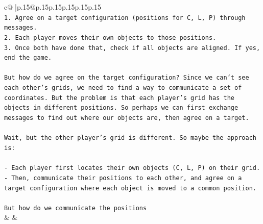 \documentclass{article}
\begin{document}
{\begin{supertabular}{c@{$\;$}|p{.15\linewidth}@{}p{.15\linewidth}p{.15\linewidth}p{.15\linewidth}p{.15\linewidth}p{.15\linewidth}}
{{{\\ 
\texttt{1. Agree on a target configuration (positions for C, L, P) through messages.} \\
\texttt{2. Each player moves their own objects to those positions.} \\
\texttt{3. Once both have done that, check if all objects are aligned. If yes, end the game.} \\
\\ 
\texttt{But how do we agree on the target configuration? Since we can't see each other's grids, we need to find a way to communicate a set of coordinates. But the problem is that each player's grid has the objects in different positions. So perhaps we can first exchange messages to find out where our objects are, then agree on a target.} \\
\\ 
\texttt{Wait, but the other player's grid is different. So maybe the approach is:} \\
\\ 
\texttt{{-} Each player first locates their own objects (C, L, P) on their grid.} \\
\texttt{{-} Then, communicate their positions to each other, and agree on a target configuration where each object is moved to a common position.} \\
\\ 
\texttt{But how do we communicate the positions} \\
            }
        }
    }
    & & \\ \\


\end{supertabular}}
\end{document}
